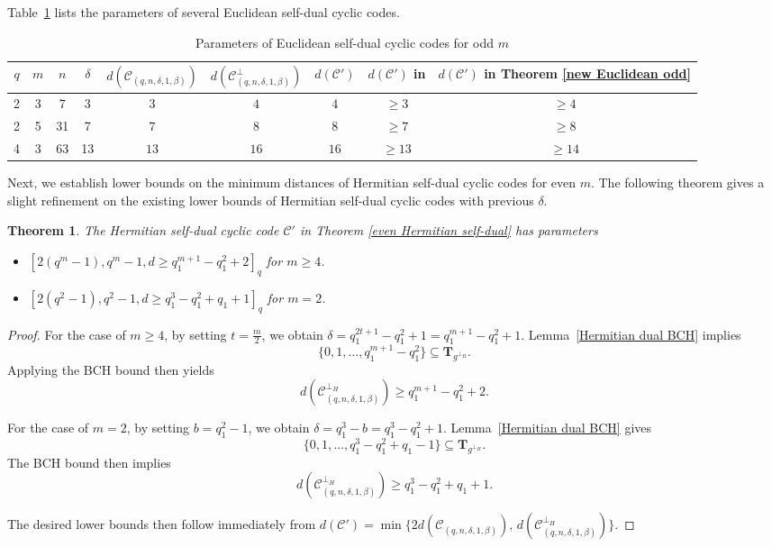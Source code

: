 \documentclass[journal,12pt,onecolumn]{IEEEtran}
\newtheorem{theorem}{Theorem}
\begin{document}
Table~\ref{odd} lists the parameters of several Euclidean self-dual cyclic codes.

\begin{table}[htbp]
  \centering 
  \caption{Parameters of Euclidean self-dual cyclic codes for odd $m$}
  \label{odd}
  \begin{tabular}{|c|c|c|c|c|c|c|c|c|}
    \hline 
    $q$ & $m$ & $n$ & $\delta$ & $d(\mathcal{C}_{(q,n,\delta,1,\beta)})$ & $d(\mathcal{C}_{(q,n,\delta,1,\beta)}^\perp)$ & $d(\mathcal{C}')$ & $d(\mathcal{C}')$ in \cite{10856234} & $d(\mathcal{C}')$ in Theorem \ref{new Euclidean odd} \\
    \hline
    2 & 3 & 7 & 3 & $3$ & $4$ & $4$ & $\ge 3$ & $\ge 4$ \\
    \hline
    2 & 5 & 31 & 7 & $7$ & $8$ & $8$ & $\ge 7$ & $\ge 8$ \\
    \hline
    4 & 3 & 63 & 13 & $13$ & $16$ & $16$ & $\ge 13$ & $\ge 14$ \\
    \hline
  \end{tabular}
\end{table}

Next, we establish lower bounds on the minimum distances of Hermitian self-dual cyclic codes for even $m$. The following theorem gives a slight refinement on the existing lower bounds of Hermitian self-dual cyclic codes with previous $\delta$.
\begin{theorem}
    \label{new Hermitian self-dual}
    The Hermitian self-dual cyclic code $\mathcal{C}'$ in Theorem \ref{even Hermitian self-dual} has parameters
    \begin{itemize}
        \item $[2(q^m-1),q^m-1,d\ge q_1^{m+1}-q_1^2+2]_q$ for $m\ge 4$.
        \item $[2(q^2-1),q^2-1,d\ge q_1^3-q_1^2+q_1+1]_q$ for $m=2$.
    \end{itemize}
\end{theorem}

\begin{proof}
For the case of $m \ge 4$, by setting $t = \frac{m}{2}$, we obtain $\delta = q_1^{2t+1} - q_1^2 + 1 = q_1^{m+1} - q_1^2 + 1$. Lemma~\ref{Hermitian dual BCH} implies
\[
\{0,1,\dots,q_1^{m+1} - q_1^2\} \subseteq \mathbf{T}_{g^{\perp_H}}.
\]
Applying the BCH bound then yields
\[
d(\mathcal{C}^{\perp_H}_{(q,n,\delta,1,\beta)}) \ge q_1^{m+1} - q_1^2 + 2.
\]

For the case of $m = 2$, by setting $b = q_1^2 - 1$, we obtain $\delta = q_1^3 - b = q_1^3 - q_1^2 + 1$. Lemma~\ref{Hermitian dual BCH} gives
\[
\{0,1,\dots,q_1^3 - q_1^2 + q_1 - 1\} \subseteq \mathbf{T}_{g^{\perp_H}}.
\]
The BCH bound then implies
\[
d(\mathcal{C}^{\perp_H}_{(q,n,\delta,1,\beta)}) \ge q_1^3 - q_1^2 + q_1 + 1.
\]

The desired lower bounds then follow immediately from
\(
d(\mathcal{C}') = \min\{2d(\mathcal{C}_{(q,n,\delta,1,\beta)}),\, d(\mathcal{C}^{\perp_H}_{(q,n,\delta,1,\beta)})\}.
\)
\end{proof}
\end{document}
